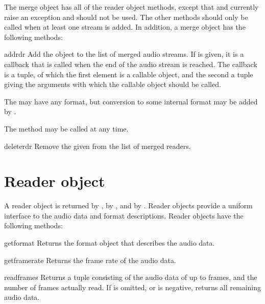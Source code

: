 The merge object has all of the reader object methods, except that
 and  currently raise an exception and
should not be used.  The other methods should only be called when at
least one stream is added.  In addition, a merge object has the
following methods:

\begin{methoddesc}{add}{rdr}
Add the  object to the list of merged audio streams.  If
 is given, it is a callback that is called when the end
of the audio stream is reached.  The callback is a tuple, of which the
first element is a callable object, and the second a tuple giving the
arguments with which the callable object should be called.

The  may have any format, but conversion to some internal
format may be added by .

The  method may be called at any time.
\end{methoddesc}

\begin{methoddesc}{delete}{rdr}
Remove the given  from the list of merged readers.
\end{methoddesc}

\section{Reader object}

A reader object is returned by , by
, and by .
Reader objects provide a uniform interface to the audio data and
format descriptions.  Reader objects have the following methods:

\begin{methoddesc}{getformat}{}
Returns the format object that describes the audio data.
\end{methoddesc}

\begin{methoddesc}{getframerate}{}
Returns the frame rate of the audio data.
\end{methoddesc}

\begin{methoddesc}{readframes}{}
Returns a tuple consisting of the audio data of up to 
frames, and the number of frames actually read.  If  is
omitted, or is negative, returns all remaining audio data.
\end{methoddesc}

